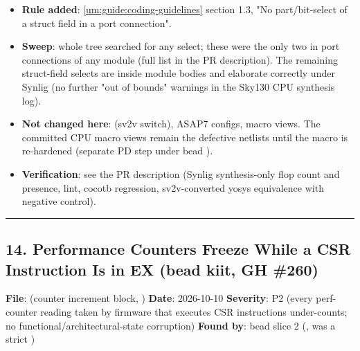 \begin{record}
\begin{itemize}
  and bead  so nobody folds them back.
\item
  \textbf{Rule added}: \cref{um:guide:coding-guidelines}
  section 1.3, "No part/\allowbreak{}bit-select of a struct field in a
  port connection".
\item
  \textbf{Sweep}: whole  tree searched for any
   select; these were the only two in port
  connections of any module (full list in the PR description). The
  remaining struct-field selects are inside module bodies and elaborate
  correctly under Synlig (no further "out of bounds" warnings in the
  Sky130 CPU synthesis log).
\item
  \textbf{Not changed here}:  (sv2v
  switch), ASAP7 configs, macro views. The committed CPU macro views
  remain the defective netlists until the macro is re-hardened (separate
  PD step under bead ).
\item
  \textbf{Verification}: see the PR description (Synlig synthesis-only
  flop count and  presence, lint, cocotb regression,
  sv2v-converted yosys equivalence with negative control).
\end{itemize}

\begin{center}\rule{0.5\linewidth}{0.5pt}\end{center}

\end{record}

\subsection{14. Performance Counters Freeze While a CSR Instruction Is
in EX (bead kiit, GH \#260)}\label{cr:fix:fixes-index:14-performance-counters-freeze-while-a-csr-instruction-is-in-ex-bead-kiit-gh-260}

\begin{record}

\textbf{File}:  (counter increment
block, ) \textbf{Date}: 2026-10-10 \textbf{Severity}: P2
(every perf-counter reading taken by firmware that executes CSR
instructions under-counts; no
functional/\allowbreak{}architectural-state corruption) \textbf{Found
by}: bead  slice 2 (, was
a strict )

\end{record}

